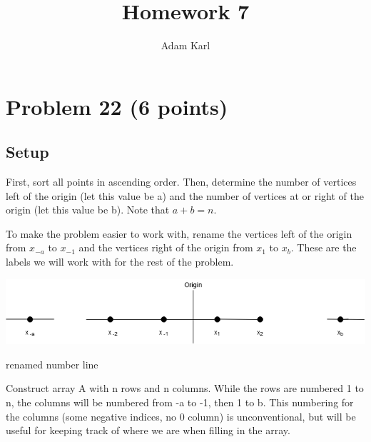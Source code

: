 \documentclass[a4paper]{article}
\title{Homework 7}
\author{Adam Karl}
\begin{document}
\maketitle

\section{Problem 22 (6 points)}
\subsection{Setup}
First, sort all points in ascending order. Then, determine the number of vertices left of the origin (let this value be a) and the number of vertices at or right of the origin (let this value be b). Note that $a + b = n$.

To make the problem easier to work with, rename the vertices left of the origin from $x_{-a}$ to $x_{-1}$ and the vertices right of the origin from $x_1$ to $x_b$. These are the labels we will work with for the rest of the problem.

\begin{center}
    \includegraphics[scale=.5]{numberLine.png}
    
    \caption{renamed number line}
\end{center}

Construct array A with n rows and n columns. While the rows are numbered 1 to n, the columns will be numbered from -a to -1, then 1 to b. This numbering for the columns (some negative indices, no 0 column) is unconventional, but will be useful for keeping track of where we are when filling in the array.
\end{document}
